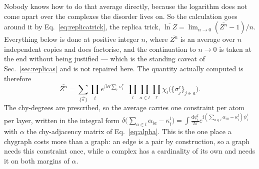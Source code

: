 Nobody knows how to do that average directly, because the logarithm does not
come apart over the complexes the disorder lives on. So the calculation goes
around it by Eq.~\eqref{eq:replicatrick}, the replica trick, $\overline{\ln
Z}=\lim_{n\to0}(\overline{Z^{n}}-1)/n$. Everything below is done at positive
integer $n$, where $\overline{Z^{n}}$ is an average over $n$ independent copies
and does factorise, and the continuation to $n\to0$ is taken at the end without
being justified --- which is the standing caveat of
Sec.~\ref{sec:replicas} and is not repaired here. The quantity actually computed
is therefore
\begin{equation}
  \overline{Z^{n}}=\sum_{\{\vec\sigma\}}\prod_{i}
    e^{\beta B\sum_{r}\sigma^{r}_{i}}\ \
    \overline{\prod_{l}\prod_{a\in l}\prod_{r}
      \chi_{l}\bigl(\{\sigma^{r}_{j}\}_{j\in a}\bigr)}.
  \label{eq:Zn}
\end{equation}
The chy-degrees are prescribed, so the average carries one constraint per atom
per layer, written in the integral form
$\delta\bigl(\sum_{a\in l}\alpha_{ia}-\kappa^{l}_{i}\bigr)
=\int\frac{\mathrm{d}\psi^{l}_{i}}{2\pi}
 e^{\mathrm{i}(\sum_{a\in l}\alpha_{ia}-\kappa^{l}_{i})\psi^{l}_{i}}$
with $\alpha$ the chy-adjacency matrix of Eq.~\eqref{eq:alpha}. This is the one
place a chygraph costs more than a graph: an edge is a pair by construction, so
a graph needs this constraint once, while a complex has a cardinality of its own
and needs it on both margins of $\alpha$.

